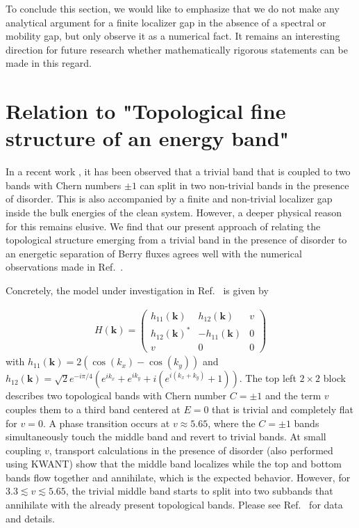 \documentclass[aps,prb,amsmath,amssymb,twocolumn, superscriptaddress]{revtex4-2}
\begin{document}
To conclude this section, we would like to emphasize that we do not make any analytical argument for a finite localizer gap in the absence of a spectral or mobility gap, but only observe it as a numerical fact. It remains an interesting direction for future research whether mathematically rigorous statements can be made in this regard. 

\section{Relation to "Topological fine structure of an energy band"} 
In a recent work \cite{Fine_structure_App}, it has been observed that a trivial band that is coupled to two bands with Chern numbers $\pm 1$ can split in two non-trivial bands in the presence of disorder. This is also accompanied by a finite and non-trivial localizer gap inside the bulk energies of the clean system. However, a deeper physical reason for this remains elusive. We find that our present approach of relating the topological structure emerging from a trivial band in the presence of disorder to an energetic separation of Berry fluxes agrees well with the numerical observations made in Ref.~\cite{Fine_structure_App}.

Concretely, the model under investigation in Ref.~\cite{Fine_structure_App} is given by

\begin{align}
H(\bm k) = \begin{pmatrix} 
h_{11}(\bm k) & h_{12}(\bm k) & v \\
h_{12}(\bm k) ^*&  -h_{11}(\bm k) & 0 \\
v & 0 & 0 
\end{pmatrix} \label{Eqn:H_fine_structure}
\end{align}
with $h_{11}(\bm k) = 2(\cos(k_x) - \cos(k_y))$ and $h_{12}(\bm k) = \sqrt{2} e^{- i \pi /4} (e^{i k_x} + e^{i k_y} + i \left(e^{i (k_x + k_y)} + 1 \right)) $. The top left $2\times 2$ block describes two topological bands with Chern number $C= \pm 1$ and the term $v$ couples them to a third band centered at $E = 0$ that is trivial and completely flat for $v= 0$. A phase transition occurs at $v \approx 5.65$, where the $C = \pm 1$ bands simultaneously touch the middle band and revert to trivial bands. At small coupling $v$, transport calculations in the presence of disorder (also performed using KWANT) show that the middle band localizes while the top and bottom bands flow together and annihilate, which is the expected behavior. However, for $3.3 \lesssim v \lesssim 5.65$, the trivial middle band starts to split into two subbands that annihilate with the already present topological bands. Please see Ref.~\cite{Fine_structure_App} for data and details. 
\end{document}
